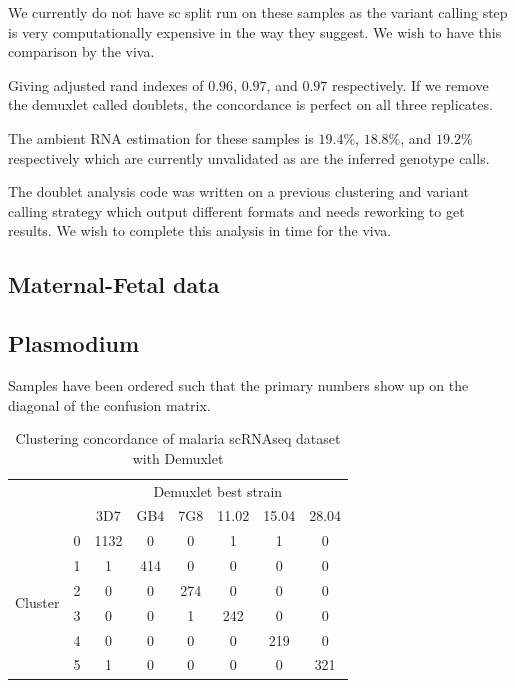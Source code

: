 We currently do not have sc split run on these samples as the variant calling step is very computationally expensive in the way they suggest. We wish to have this comparison 
by the viva.

Giving adjusted rand indexes of $0.96$, $0.97$, and $0.97$ respectively. If we remove the demuxlet called doublets, the concordance is perfect on all three replicates.

The ambient RNA estimation for these samples is $19.4\%$, $18.8\%$, and $19.2\%$ respectively which are currently unvalidated as are the inferred genotype calls.

The doublet analysis code was written on a previous clustering and variant calling strategy which output different formats and needs reworking to get results. We wish 
to complete this analysis in time for the viva.

\subsection{Maternal-Fetal data}



\subsection{Plasmodium}
Samples have been ordered such that the primary numbers show up on the diagonal of the confusion matrix.
\begin{table}[h!]
\begin{center}
\caption{Clustering concordance of malaria scRNAseq dataset with Demuxlet}
\label{table:malariaclust}
\begin{tabular}{ | c | c | c | c | c | c | c | c |} 
\hline
\multicolumn{2}{|c|}{} & \multicolumn{6}{c|}{Demuxlet best strain} \\
\cline{3-8}
\multicolumn{2}{|c|}{} & 3D7 & GB4 & 7G8 & 11.02 & 15.04 & 28.04 \\
\hline
\multirow{6}{4em}{Cluster} & 0 & 1132 & 0 & 0 & 1 & 1 & 0 \\
					 \cline{2-8}
                                           & 1 & 1 & 414 & 0 & 0 & 0 & 0 \\
                                           \cline{2-8}
                                           & 2 & 0 & 0 & 274 & 0 & 0 & 0 \\
                                           \cline{2-8}
                                           & 3 & 0 & 0 & 1 & 242 & 0 & 0 \\
                                           \cline{2-8}
                                           & 4 & 0 & 0 & 0 & 0 & 219 & 0 \\
                                           \cline{2-8}
                                           & 5 & 1 & 0 & 0 & 0 & 0 & 321 \\
                                           \hline
\end{tabular}
\end{center}
\end{table}

